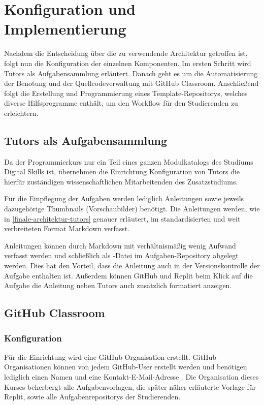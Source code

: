 \section{Konfiguration und Implementierung}\label{konfiguration-u-impl}
Nachdem die Entscheidung über die zu verwendende Architektur getroffen ist,
folgt nun die Konfiguration der einzelnen Komponenten. Im ersten Schritt wird
Tutors als Aufgabensammlung erläutert. Danach geht es um die Automatisierung der
Benotung und der Quellcodeverwaltung mit GitHub Classroom. Anschließend folgt
die Erstellung und Programmierung eines Template-Repositorys, welches diverse
Hilfsprogramme enthält, um den Workflow für den Studierenden zu erleichtern.

\subsection{Tutors als Aufgabensammlung}\label{tutors-als-aufgabensammlung}
Da der Programmierkurs nur ein Teil eines ganzen Modulkatalogs des Studiums
Digital Skills ist, übernehmen die Einrichtung Konfiguration von Tutors die
hierfür zuständigen wissenschaftlichen Mitarbeitenden des Zusatzstudiums.

Für die Einpflegung der Aufgaben werden lediglich Anleitungen sowie
jeweils dazugehörige Thumbnails (Vorschaubilder) benötigt. Die Anleitungen
werden, wie in \autoref{finale-architektur-tutors} genauer erläutert, im
standardisierten und weit verbreiteten Format Markdown verfasst.

Anleitungen können durch Markdown mit verhältnismäßig wenig Aufwand verfasst
werden und schließlich als -Datei im Aufgaben-Repository
abgelegt werden. Dies hat den Vorteil, dass die Anleitung auch in der
Versionskontrolle der Aufgabe enthalten ist. Außerdem können GitHub und Replit
beim Klick auf die Aufgabe die Anleitung neben Tutors auch zusätzlich
formatiert anzeigen.

\subsection{GitHub Classroom}\label{github-classroom}
\subsubsection{Konfiguration}\label{classroom-konfiguration}
Für die Einrichtung wird eine GitHub Organisation erstellt. GitHub
Organisationen können von jedem GitHub-User erstellt werden und benötigen
lediglich einen Namen und eine Kontakt-E-Mail-Adresse
\parencite{github-organisation-erstellen}. Die Organisation dieses Kurses
beherbergt alle Aufgabenvorlagen, die später näher erläuterte Vorlage für
Replit, sowie alle Aufgabenrepositorys der Studierenden.

